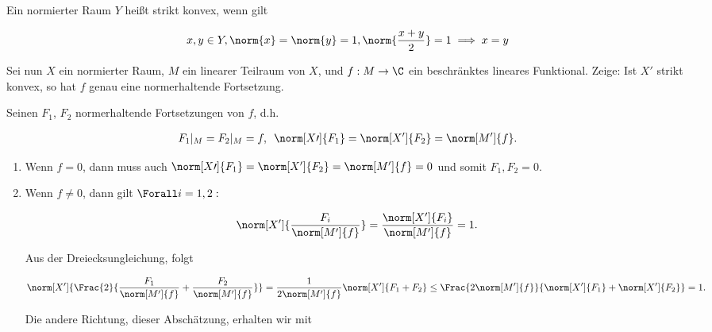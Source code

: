 \begin{exercise}

Ein normierter Raum $Y$ heißt strikt konvex, wenn gilt

\begin{align*}
  x, y \in Y,
  \norm{x} = \norm{y} = 1,
  \norm{\frac{x+y}{2}} = 1
  \implies
  x = y
\end{align*}

Sei nun $X$ ein normierter Raum, $M$ ein linearer Teilraum von $X$, und $f: M \to \C$ ein beschränktes lineares Funktional.
Zeige:
Ist $X\prime$ strikt konvex, so hat $f$ genau eine normerhaltende Fortsetzung.

\end{exercise}

\begin{solution}

Seinen $F_1$, $F_2$ normerhaltende Fortsetzungen von $f$, d.h.

\begin{align*}
  F_1|_M = F_2|_M = f,
  \enspace
  \norm[X\prime]{F_1} = \norm[X^\prime]{F_2} = \norm[M^\prime]{f}.
\end{align*}

\begin{enumerate}[label = Fall \arabic*:]

  \item
  Wenn $f = 0$, dann muss auch $\norm[X\prime]{F_1} = \norm[X^\prime]{F_2} = \norm[M^\prime]{f} = 0$ und somit $F_1, F_2 = 0$.

  \item
  Wenn $f \neq 0$, dann gilt $\Forall i = 1, 2:$

  \begin{align*}
    \norm[X^\prime]{\frac{F_i}{\norm[M^\prime]{f}}}
    =
    \frac{\norm[X^\prime]{F_i}}{\norm[M^\prime]{f}} = 1.
  \end{align*}

  Aus der Dreiecksungleichung, folgt

  \begin{align*}
    \norm[X^\prime]
    {
      \Frac{2}
      {
        \frac{F_1}{\norm[M^\prime]{f}} +
        \frac{F_2}{\norm[M^\prime]{f}}
      }
    }
    =
    \frac{1}{2 \norm[M^\prime]{f}} \norm[X^\prime]{F_1 + F_2}
    \leq
    \Frac{2 \norm[M^\prime]{f}}
    {
      \norm[X^\prime]{F_1} +
      \norm[X^\prime]{F_2}
    }
    = 1.
  \end{align*}

  Die andere Richtung, dieser Abschätzung, erhalten wir mit


\end{enumerate}
\end{solution}
